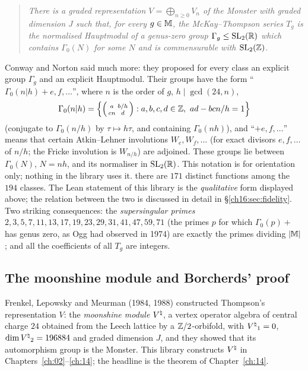 \begin{quote}\itshape
There is a graded representation $V=\bigoplus_{n\ge0}V_n$ of the Monster with graded dimension $J$ such that, for
every $g\in\mathbb{M}$, the McKay--Thompson series $T_g$ is the normalised Hauptmodul of a genus-zero group
$\Gamma_g\le\mathrm{SL}_2(\mathbb{R})$ which contains $\Gamma_0(N)$ for some $N$ and is commensurable with $\mathrm{SL}_2(\mathbb{Z})$.
\end{quote}
Conway and Norton said much more: they proposed for every class an explicit group $\Gamma_g$ and an explicit
Hauptmodul.  Their groups have the form ``$\Gamma_0(n|h)+e,f,\dots$'', where $n$ is the order of $g$, $h\mid\gcd(24,n)$,
\begin{equation*}
  \Gamma_0(n|h)=\Bigl\{\left(\begin{smallmatrix}a&b/h\\cn&d\end{smallmatrix}\right): a,b,c,d\in{\mathbb{Z}},\ ad-bcn/h=1\Bigr\}
\end{equation*}
(conjugate to $\Gamma_0(n/h)$ by $\tau\mapsto h\tau$, and containing $\Gamma_0(nh)$), and ``$+e,f,\dots$'' means that
certain Atkin--Lehner involutions $W_e,W_f,\dots$ (for exact divisors $e,f,\dots$ of $n/h$; the Fricke involution is
$W_{n/h}$) are adjoined.  These groups lie between $\Gamma_0(N)$, $N=nh$, and its normaliser in $\mathrm{SL}_2(\mathbb{R})$.  This
notation is for orientation only; nothing in the library uses it. there are $171$ distinct functions among the $194$
classes.  The Lean statement of this library is the \emph{qualitative} form displayed above; the relation between
the two is discussed in detail in \S\ref{ch16:sec:fidelity}.  Two striking consequences: the \emph{supersingular
primes} $2,3,5,7,11,13,17,19,23,29,31,41,47,59,71$ (the primes $p$ for which $\Gamma_0(p)+$ has genus zero, as Ogg
had observed in 1974) are exactly the primes dividing $|\mathbb{M}|$; and all the coefficients of all $T_g$ are
integers.

\subsection{The moonshine module and Borcherds' proof}

Frenkel, Lepowsky and Meurman (1984, 1988) constructed Thompson's representation $V$: the \emph{moonshine module}
${V^{\natural}}$, a vertex operator algebra of central charge $24$ obtained from the Leech lattice by a ${\mathbb{Z}}/2$-orbifold, with
${V^{\natural}}_1=0$, $\dim{V^{\natural}}_2=196884$ and graded dimension $J$, and they showed that its automorphism group is the
Monster.  This library constructs ${V^{\natural}}$ in Chapters~\ref{ch:02}--\ref{ch:14}; the headline is the theorem
 of Chapter~\ref{ch:14}.


